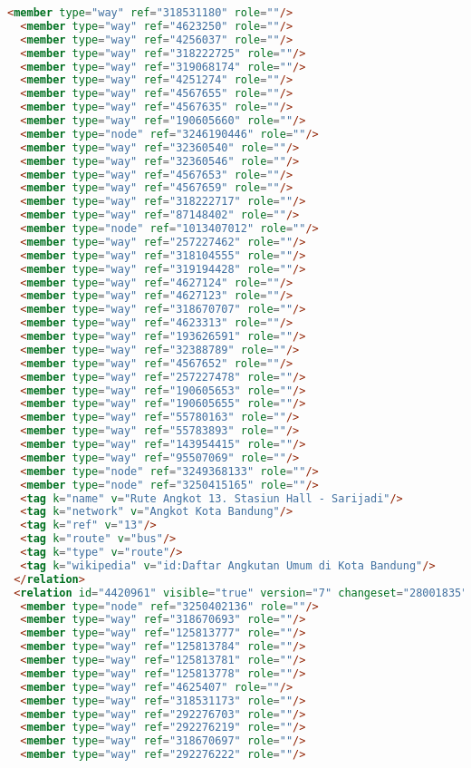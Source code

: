 \begin{lstlisting}[language=HTML,basicstyle=\tiny,caption=bandung1.xml]
  <member type="way" ref="318531180" role=""/>
  <member type="way" ref="4623250" role=""/>
  <member type="way" ref="4256037" role=""/>
  <member type="way" ref="318222725" role=""/>
  <member type="way" ref="319068174" role=""/>
  <member type="way" ref="4251274" role=""/>
  <member type="way" ref="4567655" role=""/>
  <member type="way" ref="4567635" role=""/>
  <member type="way" ref="190605660" role=""/>
  <member type="node" ref="3246190446" role=""/>
  <member type="way" ref="32360540" role=""/>
  <member type="way" ref="32360546" role=""/>
  <member type="way" ref="4567653" role=""/>
  <member type="way" ref="4567659" role=""/>
  <member type="way" ref="318222717" role=""/>
  <member type="way" ref="87148402" role=""/>
  <member type="node" ref="1013407012" role=""/>
  <member type="way" ref="257227462" role=""/>
  <member type="way" ref="318104555" role=""/>
  <member type="way" ref="319194428" role=""/>
  <member type="way" ref="4627124" role=""/>
  <member type="way" ref="4627123" role=""/>
  <member type="way" ref="318670707" role=""/>
  <member type="way" ref="4623313" role=""/>
  <member type="way" ref="193626591" role=""/>
  <member type="way" ref="32388789" role=""/>
  <member type="way" ref="4567652" role=""/>
  <member type="way" ref="257227478" role=""/>
  <member type="way" ref="190605653" role=""/>
  <member type="way" ref="190605655" role=""/>
  <member type="way" ref="55780163" role=""/>
  <member type="way" ref="55783893" role=""/>
  <member type="way" ref="143954415" role=""/>
  <member type="way" ref="95507069" role=""/>
  <member type="node" ref="3249368133" role=""/>
  <member type="node" ref="3250415165" role=""/>
  <tag k="name" v="Rute Angkot 13. Stasiun Hall - Sarijadi"/>
  <tag k="network" v="Angkot Kota Bandung"/>
  <tag k="ref" v="13"/>
  <tag k="route" v="bus"/>
  <tag k="type" v="route"/>
  <tag k="wikipedia" v="id:Daftar Angkutan Umum di Kota Bandung"/>
 </relation>
 <relation id="4420961" visible="true" version="7" changeset="28001835" timestamp="2015-01-08T17:46:26Z" user="isonpurba" uid="2552445">
  <member type="node" ref="3250402136" role=""/>
  <member type="way" ref="318670693" role=""/>
  <member type="way" ref="125813777" role=""/>
  <member type="way" ref="125813784" role=""/>
  <member type="way" ref="125813781" role=""/>
  <member type="way" ref="125813778" role=""/>
  <member type="way" ref="4625407" role=""/>
  <member type="way" ref="318531173" role=""/>
  <member type="way" ref="292276703" role=""/>
  <member type="way" ref="292276219" role=""/>
  <member type="way" ref="318670697" role=""/>
  <member type="way" ref="292276222" role=""/>

\end{lstlisting}
